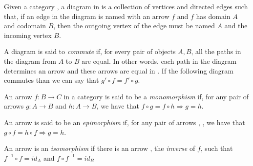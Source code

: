 
\begin{definition}[Diagram] Given a category , a diagram in  is a collection of vertices and directed edges such that, if an edge in the diagram is named with an arrow $f$ and $f$ has domain $A$ and codomain $B$, then the outgoing vertex of the edge must be named $A$ and the incoming vertex $B$.

  A diagram is said to \emph{commute} if, for every pair of objects $A,B$, all the paths in the diagram from $A$ to $B$ are equal. In other words, each path in the diagram determines an arrow and these arrows are equal in . If the following diagram commutes than we can say that \mbox{$g' \circ f = f' \circ g$}.


\end{definition}

\begin{definition} An arrow \mbox{$f : B \rightarrow C$} in a category  is said to be a \emph{monomorphism} if, for any pair of arrows $g : A \rightarrow B$ and $h : A \rightarrow B$, we have that $f \circ g = f \circ h \Rightarrow g = h$.


  An arrow  is said to be an \emph{epimorphism} if, for any pair of arrows , , we have that \mbox{$g \circ f = h \circ f \Rightarrow g = h$}.


  An arrow  is an \emph{isomorphism} if there is an arrow , the \emph{inverse} of $f$, such that \mbox{$f^{-1} \circ f = id_A$} and \mbox{$f \circ f^{-1} = id_B$}


\end{definition}

